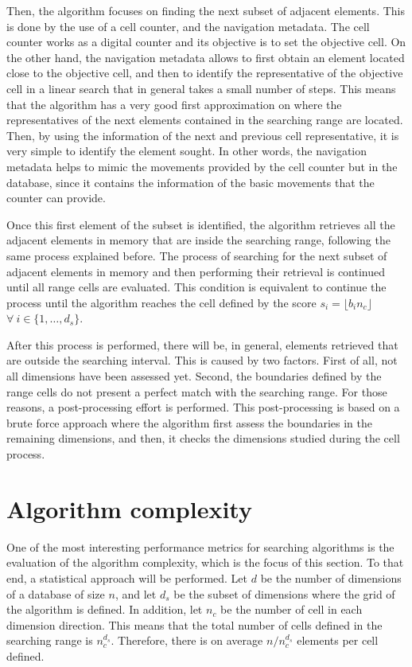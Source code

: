 \documentclass[preprint,12pt]{elsarticle}
\begin{document}
Then, the algorithm focuses on finding the next subset of adjacent elements. This is done by the use of a cell counter, and the navigation metadata. The cell counter works as a digital counter and its objective is to set the objective cell. On the other hand, the navigation metadata allows to first obtain an element located close to the objective cell, and then to identify the representative of the objective cell in a linear search that in general takes a small number of steps. This means that the algorithm has a very good first approximation on where the representatives of the next elements contained in the searching range are located. Then, by using the information of the next and previous cell representative, it is very simple to identify the element sought. In other words, the navigation metadata helps to mimic the movements provided by the cell counter but in the database, since it contains the information of the basic movements that the counter can provide. 

Once this first element of the subset is identified, the algorithm retrieves all the adjacent elements in memory that are inside the searching range, following the same process explained before. The process of searching for the next subset of adjacent elements in memory and then performing their retrieval is continued until all range cells are evaluated. This condition is equivalent to continue the process until the algorithm reaches the cell defined by the score $s_i = \lfloor b_in_c \rfloor$ $\forall \: i\in\{1,\dots,d_s\}$. 

After this process is performed, there will be, in general, elements retrieved that are outside the searching interval. This is caused by two factors. First of all, not all dimensions have been assessed yet. Second, the boundaries defined by the range cells do not present a perfect match with the searching range. For those reasons, a post-processing effort is performed. This post-processing is based on a brute force approach where the algorithm first assess the boundaries in the remaining dimensions, and then, it checks the dimensions studied during the cell process.



\section{Algorithm complexity}
\label{sec:complexity}

One of the most interesting performance metrics for searching algorithms is the evaluation of the algorithm complexity, which is the focus of this section. To that end, a statistical approach will be performed. Let $d$ be the number of dimensions of a database of size $n$, and let $d_s$ be the subset of dimensions where the grid of the algorithm is defined. In addition, let $n_c$ be the number of cell in each dimension direction. This means that the total number of cells defined in the searching range is $n_c^{d_s}$. Therefore, there is on average $n/n_c^{d_s}$ elements per cell defined. 
\end{document}
